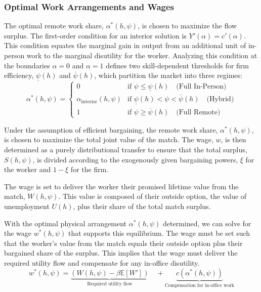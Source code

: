 \documentclass[
  11pt,
  letterpaper,
  DIV=11,
  numbers=noendperiod]{scrartcl}
\begin{document}
\subsubsection{Optimal Work Arrangements and
Wages}\label{optimal-work-arrangements-and-wages}

The optimal remote work share, \(\alpha^*(h, \psi)\), is chosen to
maximize the flow surplus. The first-order condition for an interior
solution is \(Y'(\alpha) = c'(\alpha)\). This condition equates the
marginal gain in output from an additional unit of in-person work to the
marginal disutility for the worker. Analyzing this condition at the
boundaries \(\alpha=0\) and \(\alpha=1\) defines two skill-dependent
thresholds for firm efficiency, \(\underline{\psi}(h)\) and
\(\overline{\psi}(h)\), which partition the market into three regimes:
\[\alpha^*(h, \psi) = \begin{cases} 0 & \text{if } \psi \leq \underline{\psi}(h) \quad \text{(Full In-Person)} \\ \alpha_{\text{interior}}(h, \psi) & \text{if } \underline{\psi}(h) < \psi < \overline{\psi}(h) \quad \text{(Hybrid)} \\ 1 & \text{if } \psi \geq \overline{\psi}(h) \quad \text{(Full Remote)} \end{cases}\]

Under the assumption of efficient bargaining, the remote work share,
\(\alpha^*(h, \psi)\), is chosen to maximize the total joint value of
the match. The wage, \(w\), is then determined as a purely
distributional transfer to ensure that the total surplus,
\(S(h, \psi)\), is divided according to the exogenously given bargaining
powers, \(\xi\) for the worker and \(1-\xi\) for the firm.

The wage is set to deliver the worker their promised lifetime value from
the match, \(W(h, \psi)\). This value is composed of their outside
option, the value of unemployment \(U(h)\), plus their share of the
total match surplus.

With the optimal physical arrangement \(\alpha^*(h, \psi)\) determined,
we can solve for the wage \(w^*(h, \psi)\) that supports this
equilibrium. The wage must be set such that the worker's value from the
match equals their outside option plus their bargained share of the
surplus. This implies that the wage must deliver the required utility
flow and compensate for any in-office disutility. \[
w^*(h, \psi) = \underbrace{\left( W(h, \psi) - \beta \mathbb{E}[W'] \right)}_{\text{Required utility flow}} \quad + \underbrace{c(\alpha^*(h, \psi))}_{\text{Compensation for in-office work}}
\]
\end{document}

